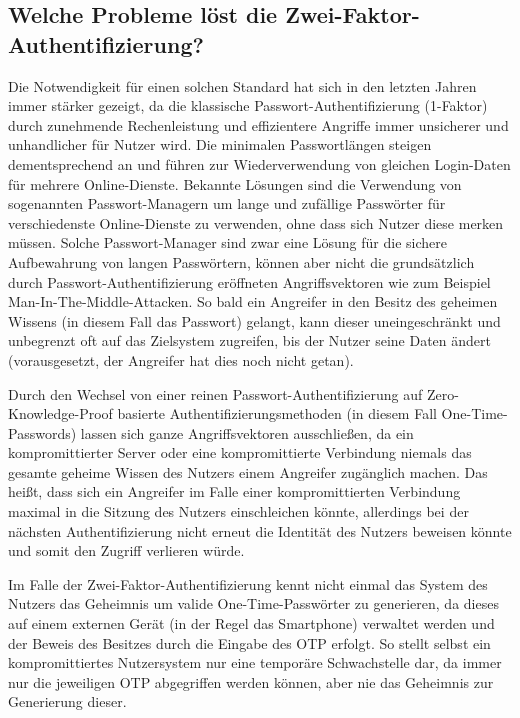 \documentclass{article}
\begin{document}
\subsection{Welche Probleme löst die Zwei-Faktor-Authentifizierung?}

Die Notwendigkeit für einen solchen Standard hat sich in den letzten Jahren
immer stärker gezeigt, da die klassische Passwort-Authentifizierung (1-Faktor)
durch zunehmende Rechenleistung und effizientere Angriffe immer unsicherer und
unhandlicher für Nutzer wird. Die minimalen Passwortlängen steigen
dementsprechend an und führen zur Wiederverwendung von gleichen Login-Daten für
mehrere Online-Dienste. Bekannte Lösungen sind die Verwendung von sogenannten
Passwort-Managern um lange und zufällige Passwörter für verschiedenste
Online-Dienste zu verwenden, ohne dass sich Nutzer diese merken müssen. Solche
Passwort-Manager sind zwar eine Lösung für die sichere Aufbewahrung von langen
Passwörtern, können aber nicht die grundsätzlich durch
Passwort-Authentifizierung eröffneten Angriffsvektoren wie zum Beispiel
Man-In-The-Middle-Attacken. So bald ein Angreifer in den Besitz des geheimen
Wissens (in diesem Fall das Passwort) gelangt, kann dieser uneingeschränkt und
unbegrenzt oft auf das Zielsystem zugreifen, bis der Nutzer seine Daten
ändert (vorausgesetzt, der Angreifer hat dies noch nicht getan).

Durch den Wechsel von einer reinen Passwort-Authentifizierung auf
Zero-Knowledge-Proof basierte Authentifizierungsmethoden (in diesem Fall
One-Time-Passwords) lassen sich ganze Angriffsvektoren ausschließen,
da ein kompromittierter Server oder eine kompromittierte Verbindung niemals das
gesamte geheime Wissen des Nutzers einem Angreifer zugänglich machen. Das
heißt, dass sich ein Angreifer im Falle einer kompromittierten Verbindung
maximal in die Sitzung des Nutzers einschleichen könnte, allerdings bei der
nächsten Authentifizierung nicht erneut die Identität des Nutzers beweisen
könnte und somit den Zugriff verlieren würde.

Im Falle der Zwei-Faktor-Authentifizierung kennt nicht einmal das System des
Nutzers das Geheimnis um valide One-Time-Passwörter zu generieren, da
dieses auf einem externen Gerät (in der Regel das Smartphone) verwaltet werden
und der Beweis des Besitzes durch die Eingabe des OTP erfolgt. So stellt selbst
ein kompromittiertes Nutzersystem nur eine temporäre Schwachstelle dar, da
immer nur die jeweiligen OTP abgegriffen werden können, aber nie das Geheimnis
zur Generierung dieser.
\end{document}
